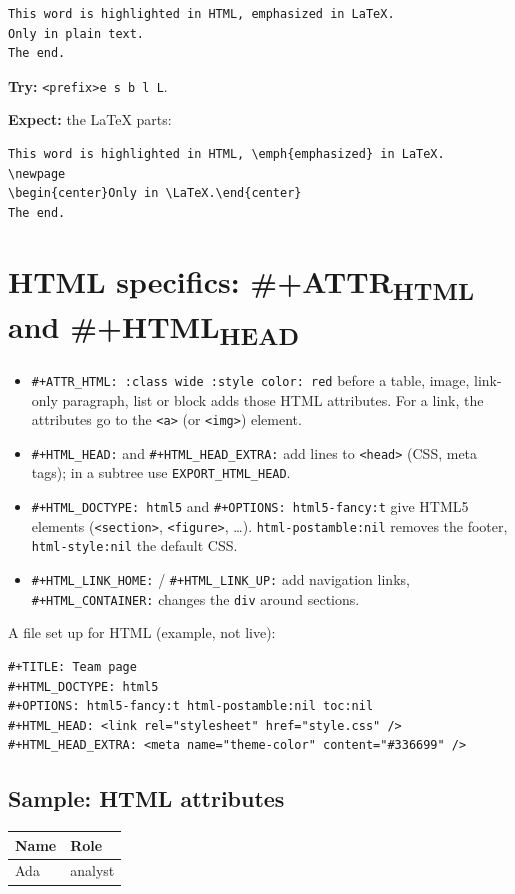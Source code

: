 \begin{verbatim}
This word is highlighted in HTML, emphasized in LaTeX.
Only in plain text.
The end.
\end{verbatim}

\textbf{Try:} \texttt{<prefix>e s b l L}.

\textbf{Expect:} the \LaTeX{} parts:

\begin{verbatim}
This word is highlighted in HTML, \emph{emphasized} in LaTeX.
\newpage
\begin{center}Only in \LaTeX.\end{center}
The end.
\end{verbatim}
\section{HTML specifics: \#+ATTR\textsubscript{HTML} and \#+HTML\textsubscript{HEAD}}
\label{sec:org024036c}
\begin{itemize}
\item \texttt{\#+ATTR\_HTML: :class wide :style color: red} before a table, image,
link-only paragraph, list or block adds those HTML attributes. For a
link, the attributes go to the \texttt{<a>} (or \texttt{<img>}) element.
\item \texttt{\#+HTML\_HEAD:} and \texttt{\#+HTML\_HEAD\_EXTRA:} add lines to \texttt{<head>} (CSS,
meta tags); in a subtree use \texttt{EXPORT\_HTML\_HEAD}.
\item \texttt{\#+HTML\_DOCTYPE: html5} and \texttt{\#+OPTIONS: html5-fancy:t} give HTML5
elements (\texttt{<section>}, \texttt{<figure>}, \ldots{}). \texttt{html-postamble:nil} removes
the footer, \texttt{html-style:nil} the default CSS.
\item \texttt{\#+HTML\_LINK\_HOME:} / \texttt{\#+HTML\_LINK\_UP:} add navigation links,
\texttt{\#+HTML\_CONTAINER:} changes the \texttt{div} around sections.
\end{itemize}

A file set up for HTML (example, not live):

\begin{verbatim}
#+TITLE: Team page
#+HTML_DOCTYPE: html5
#+OPTIONS: html5-fancy:t html-postamble:nil toc:nil
#+HTML_HEAD: <link rel="stylesheet" href="style.css" />
#+HTML_HEAD_EXTRA: <meta name="theme-color" content="#336699" />
\end{verbatim}
\subsection{Sample: HTML attributes}
\label{sec:orgd2a95fb}
\begin{center}
\begin{tabular}{ll}
Name & Role\\
\hline
Ada & analyst\\
\end{tabular}
\end{center}

